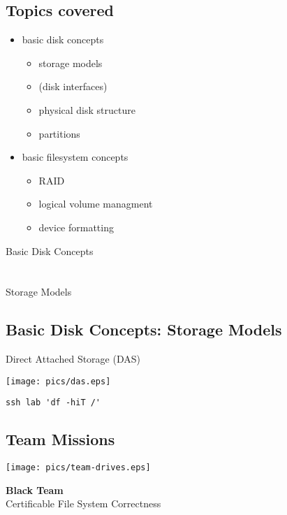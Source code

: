 \documentclass[xga]{xdvislides}
\begin{document}
\subsection{Topics covered}
\begin{itemize}
	\item basic disk concepts
		\begin{itemize}
			\item storage models
			\item (disk interfaces)
			\item physical disk structure
			\item partitions
		\end{itemize}
	\item basic filesystem concepts
		\begin{itemize}
			\item RAID
			\item logical volume managment
			\item device formatting
		\end{itemize}
\end{itemize}

\newpage
\vspace*{\fill}
\begin{center}
	\Hugesize
		Basic Disk Concepts \\ [1em]
	\hspace*{5mm}
	\blueline\\
	\hspace*{5mm}\\
		Storage Models
\end{center}
\vspace*{\fill}

\subsection{Basic Disk Concepts: Storage Models}
Direct Attached Storage (DAS)
\vfill
\begin{center}
	\texttt{[image: pics/das.eps]} \\
\end{center}
\verb+ssh lab 'df -hiT /'+
\vfill

\subsection{Team Missions}
\vfill
\begin{center}
	\texttt{[image: pics/team-drives.eps]} \\
\end{center}
{\bf Black Team} \\
Certificable File System Correctness \\
\vfill
\end{document}
